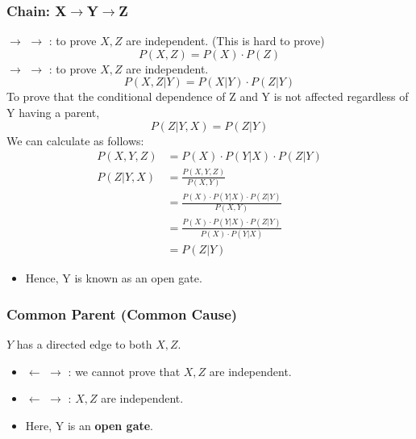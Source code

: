 \documentclass[a4paper]{article}
\newcommand*{\img}[1]{%
	\raisebox{-.3\baselineskip}{%
		\texttt{[image: \#1]}%
	}%
}
\begin{document}
\subsubsection{Chain: X$\rightarrow$Y$\rightarrow$Z}
\img{images/26AA}$\rightarrow$\img{images/26AB}$\rightarrow$\img{images/26AA}: to prove $X, Z$ are independent. (This is hard to prove) $$ P(X,Z) = P(X) \cdot P(Z) $$
\img{images/26AA}$\rightarrow$\img{images/26AA}$\rightarrow$\img{images/26AA}: to prove $X, Z$ are independent.
$$P(X,Z|Y) = P(X|Y) \cdot P(Z|Y)$$
\newpage
\noindent To prove that the conditional dependence of Z and Y is not affected regardless of Y having a parent, $$ P(Z|Y,X) = P(Z|Y) $$
\noindent We can calculate as follows:
\begin{align*}
	P(X,Y,Z) &= P(X)\cdot P(Y|X) \cdot P(Z|Y)\\
	P(Z|Y,X) &= \frac{P(X,Y,Z)}{P(X,Y)}\\
	&= \frac{P(X)\cdot P(Y|X) \cdot P(Z|Y)}{P(X,Y)}\\
	&= \frac{P(X)\cdot P(Y|X) \cdot P(Z|Y)}{P(X) \cdot P(Y|X)}\\
	&= P(Z|Y)
\end{align*}
\begin{itemize}
	\item Hence, Y is known as an open gate.
\end{itemize}

\subsubsection{Common Parent (Common Cause)}
$Y$ has a directed edge to both $X,Z$.
\begin{itemize}
	\item \img{images/26AA}$\leftarrow$\img{images/26AB}$\rightarrow$\img{images/26AA}: we cannot prove that $X,Z$ are independent.
	\item \img{images/26AA}$\leftarrow$\img{images/26AA}$\rightarrow$\img{images/26AA}: $X,Z$ are independent.
	\item Here, Y is an \textbf{open gate}.
\end{itemize}
\end{document}
